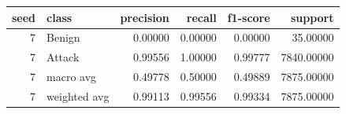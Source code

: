 \begin{tabular}{rlrrrr}
\toprule
seed & class & precision & recall & f1-score & support \\
\midrule
7 & Benign & 0.00000 & 0.00000 & 0.00000 & 35.00000 \\
7 & Attack & 0.99556 & 1.00000 & 0.99777 & 7840.00000 \\
7 & macro avg & 0.49778 & 0.50000 & 0.49889 & 7875.00000 \\
7 & weighted avg & 0.99113 & 0.99556 & 0.99334 & 7875.00000 \\
\bottomrule
\end{tabular}
